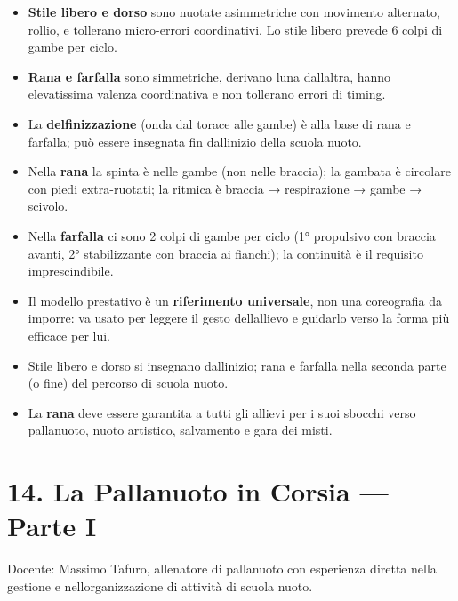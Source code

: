 \documentclass[a4paper,11pt]{article}
\providecommand{\tightlist}{%
  \setlength{\itemsep}{0pt}\setlength{\parskip}{0pt}}
\begin{document}
\begin{itemize}
      \tightlist
      \item
            \textbf{Stile libero e dorso} sono nuotate asimmetriche con movimento
            alternato, rollio, e tollerano micro-errori coordinativi. Lo stile
            libero prevede 6 colpi di gambe per ciclo.
      \item
            \textbf{Rana e farfalla} sono simmetriche, derivano
            l\textquotesingle una dall\textquotesingle altra, hanno elevatissima
            valenza coordinativa e non tollerano errori di timing.
      \item
            La \textbf{delfinizzazione} (onda dal torace alle gambe) è alla base
            di rana e farfalla; può essere insegnata fin
            dall\textquotesingle inizio della scuola nuoto.
      \item
            Nella \textbf{rana} la spinta è nelle gambe (non nelle braccia); la
            gambata è circolare con piedi extra-ruotati; la ritmica è braccia →
            respirazione → gambe → scivolo.
      \item
            Nella \textbf{farfalla} ci sono 2 colpi di gambe per ciclo (1°
            propulsivo con braccia avanti, 2° stabilizzante con braccia ai
            fianchi); la continuità è il requisito imprescindibile.
      \item
            Il modello prestativo è un \textbf{riferimento universale}, non una
            coreografia da imporre: va usato per leggere il gesto
            dell\textquotesingle allievo e guidarlo verso la forma più efficace
            per lui.
      \item
            Stile libero e dorso si insegnano dall\textquotesingle inizio; rana e
            farfalla nella seconda parte (o fine) del percorso di scuola nuoto.
      \item
            La \textbf{rana} deve essere garantita a tutti gli allievi per i suoi
            sbocchi verso pallanuoto, nuoto artistico, salvamento e gara dei
            misti.
\end{itemize}

\section{14. La Pallanuoto in Corsia --- Parte
  I}\label{la-pallanuoto-in-corsia-parte-i}

Docente: Massimo Tafuro, allenatore di pallanuoto con esperienza diretta
nella gestione e nell\textquotesingle organizzazione di attività di
scuola nuoto.
\end{document}
